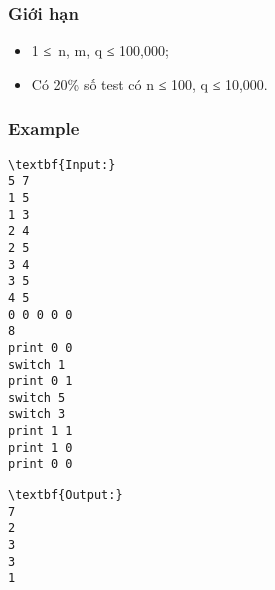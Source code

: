 \subsubsection{Giới hạn}
\begin{itemize}
	\item 1 ≤ n, m, q ≤ 100,000;
	\item Có 20\% số test có n ≤ 100, q ≤ 10,000.
\end{itemize}

\subsubsection{Example}
\begin{verbatim}
\textbf{Input:}
5 7
1 5
1 3
2 4
2 5
3 4
3 5
4 5
0 0 0 0 0
8
print 0 0
switch 1
print 0 1
switch 5
switch 3
print 1 1
print 1 0
print 0 0
\end{verbatim}
\begin{verbatim}
\textbf{Output:}
7
2
3
3
1

\end{verbatim}
